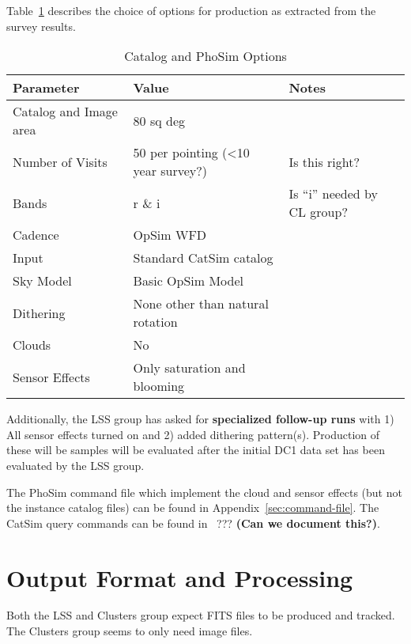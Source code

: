 \documentclass[12pt,letterpaper]{article}
\begin{document}
Table~\ref{tab:phosim-options} describes the choice of options for
production as extracted from the survey results.

\begin{table}[!htb]
  \begin{tabular}{| l| l| p{3cm} | }
    \hline 
    Parameter                       & Value   & Notes  \\
    \hline
    Catalog and Image area  & 80 sq deg & \\
    Number of Visits            & 50 per pointing (\textless 10 year survey?) &  Is this right? \\
    Bands                             & r \& i   &    Is ``i'' needed by CL group? \\
    Cadence                         & OpSim WFD  & \\
    Input                              & Standard CatSim catalog & \\
    Sky Model                      & Basic OpSim Model & \\
    Dithering                       & None other than natural rotation   & \\
    Clouds                           & No & \\
    Sensor Effects                & Only saturation and blooming& \\
    \hline
  \end{tabular}
  \caption{Catalog and PhoSim Options}
  \label{tab:phosim-options}
\end{table}

Additionally, the LSS group has asked for {\bf specialized follow-up
  runs} with 1) All sensor effects turned on and 2) added dithering
pattern(s).  Production of these will be samples will be evaluated
after the initial DC1 data set has been evaluated by the LSS group.

The PhoSim command file which implement the cloud and sensor effects (but not the
instance catalog files) can be found in Appendix~\ref{sec:command-file}.  The
CatSim query commands can be found in~ ??? {\bf (Can we document this?)}.

\section{Output Format and Processing}

Both the LSS and Clusters group expect FITS files to be produced and
tracked.  The Clusters group seems to only need image files.  \\
\end{document}

